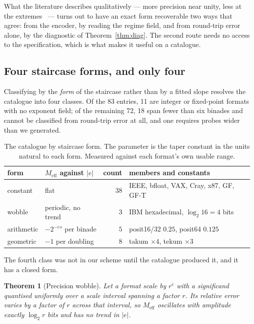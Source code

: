 \documentclass[11pt]{article}
\newtheorem{theorem}{Theorem}
\theoremstyle{definition}
\begin{document}
What the literature describes qualitatively --- more precision near unity, less
at the extremes~\cite{gustafson} --- turns out to have an exact form recoverable
two ways that agree: from the encoder, by reading the regime field, and from
round-trip error alone, by the diagnostic of Theorem~\ref{thm:diag}. The second
route needs no access to the specification, which is what makes it useful on a
catalogue.


\subsection{Four staircase forms, and only four}\label{sec:taxonomy}

Classifying by the \emph{form} of the staircase rather than by a fitted slope
resolves the catalogue into four classes. Of the 83 entries, 11 are integer or
fixed-point formats with no exponent field; of the remaining 72, 18 span fewer
than six binades and cannot be classified from round-trip error at all, and one
requires probes wider than we generated.

\begin{table}[t]\centering
\caption{The catalogue by staircase form. The parameter is the taper constant in
the units natural to each form. Measured against each format's own usable range.}
\label{tab:taxonomy}
\begin{tabular}{llrl}
\toprule
form & $M_{\mathrm{eff}}$ against $|e|$ & count & members and constants \\
\midrule
constant   & flat                          & $38$ & IEEE, bfloat, VAX, Cray, x87, GF, GF-T \\
wobble     & periodic, no trend            & $3$  & IBM hexadecimal, $\log_2 16 = 4$ bits \\
arithmetic & $-2^{-es}$ per binade         & $5$  & posit16/32 $0.25$, posit64 $0.125$ \\
geometric  & $-1$ per doubling             & $8$  & takum $\times 4$, tekum $\times 3$ \\
\bottomrule
\end{tabular}
\end{table}

The fourth class was not in our scheme until the catalogue produced it, and it has
a closed form.

\begin{theorem}[Precision wobble]
\label{thm:wobble}
Let a format scale by $r^{e}$ with a significand quantised uniformly over a
scale interval spanning a factor $r$. Its relative error varies by a factor of
$r$ across that interval, so $M_{\mathrm{eff}}$ oscillates with amplitude exactly
$\log_2 r$ bits and has no trend in $|e|$.
\end{theorem}
\end{document}
